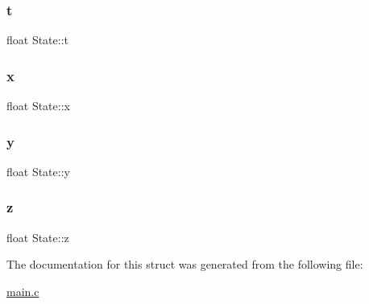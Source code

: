 \subsubsection{\texorpdfstring{t}{t}}
{\footnotesize\ttfamily float State\+::t}

\mbox{\label{structState_a9948cc668f49246582cfd131b7928f7e}} 
\subsubsection{\texorpdfstring{x}{x}}
{\footnotesize\ttfamily float State\+::x}

\mbox{\label{structState_a89572abb38dea3b1a780ede589a2d59b}} 
\subsubsection{\texorpdfstring{y}{y}}
{\footnotesize\ttfamily float State\+::y}

\mbox{\label{structState_aed6ded85740f752ec9c5c2ca499da5a9}} 
\subsubsection{\texorpdfstring{z}{z}}
{\footnotesize\ttfamily float State\+::z}



The documentation for this struct was generated from the following file\+:\begin{DoxyCompactItemize}
\item 
\hyperlink{main_8c}{main.\+c}\end{DoxyCompactItemize}
